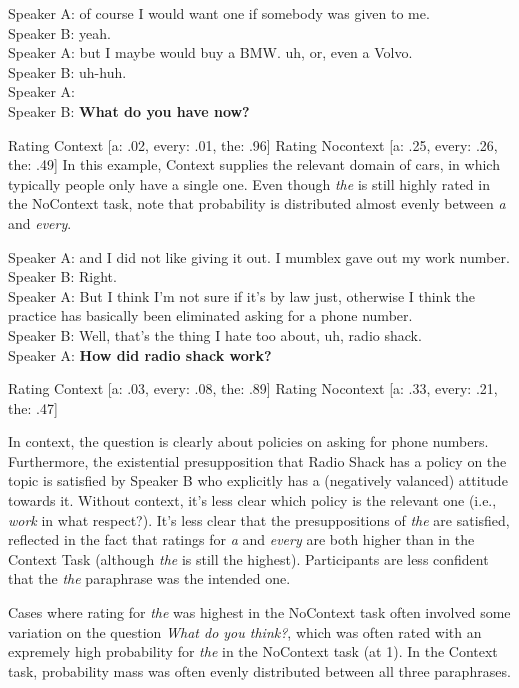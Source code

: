 \documentclass[12pt,letterpaper,table,svgnames,dvipsnames]{article}
\begin{document}
\begin{exe}
    \ex {}
    Speaker A: of course I would want one if somebody was given to me.\\
    Speaker B: yeah.\\
    Speaker A: but I maybe would buy a BMW. uh, or, even a Volvo.\\
    Speaker B: uh-huh.\\
    Speaker A: \\
    Speaker B: \textbf{What do you have now?}
\end{exe}
Rating Context [a: .02, every: .01, the: .96]
Rating Nocontext [a: .25, every: .26, the: .49]
In this example, Context supplies the relevant domain of cars, in which typically people only have a single one. Even though \emph{the} is still highly rated in the NoContext task, note that probability is distributed almost evenly between \emph{a} and \emph{every}. 


\begin{exe}
    \ex {}
    Speaker A: and I did not like giving it out. I mumblex gave out my work number.\\
    Speaker B: Right.\\
    Speaker A: But I think I'm not sure if it's by law just, otherwise I think the practice has basically been eliminated asking for a phone number.\\
    Speaker B: Well, that's the thing I hate too about, uh, radio shack. \\
    Speaker A: \textbf{How did radio shack work?}
\end{exe}
Rating Context [a: .03, every: .08, the: .89]
Rating Nocontext [a: .33, every: .21, the: .47]

In context, the question is clearly about policies on asking for phone numbers. Furthermore, the existential presupposition that Radio Shack has a policy on the topic is satisfied by Speaker B who explicitly has a (negatively valanced) attitude towards it. Without context, it's less clear which policy is the relevant one (i.e., \emph{work} in what respect?). It's less clear that the presuppositions of \emph{the} are satisfied, reflected in the fact that ratings for \emph{a} and \emph{every} are both higher than in the Context Task (although \emph{the} is still the highest). Participants are less confident that the \emph{the} paraphrase was the intended one. 

Cases where rating for \emph{the} was highest in the NoContext task often involved some variation on the question \emph{What do you think?}, which was often rated with an expremely high probability for \emph{the} in the NoContext task (at 1). In the Context task, probability mass was often evenly distributed between all three paraphrases.
\end{document}
